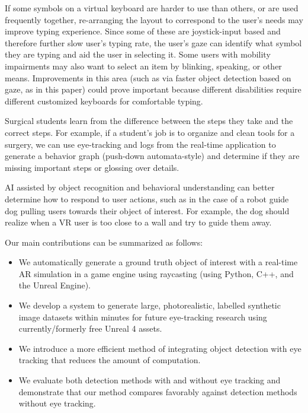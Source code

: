 \begin{description}[leftmargin=*]
    \item[Adaptive Impaired-user Keyboards]
    If some symbols on a virtual keyboard are harder to use than others, or
    are used frequently together, re-arranging the layout to correspond to
    the user's needs may improve typing experience. Since some of these are
    joystick-input based and therefore further slow user's typing rate, the
    user's gaze can identify what symbol they are typing and aid the user in
    selecting it. Some users with mobility impairments may also want to
    select an item by blinking, speaking, or other means. Improvements in
    this area (such as via faster object detection based on gaze, as in this
    paper) could prove important because different disabilities require
    different customized keyboards for comfortable typing.
    \item[Surgical Training]
    Surgical students learn from the difference between the steps they take
    and the correct steps. For example, if a student's job is to organize
    and clean tools for a surgery, we can use eye-tracking and logs from the
    real-time application to generate a behavior graph (push-down
    automata-style) and determine if they are missing important steps or
    glossing over details.
    \item[Dynamic Robot AI]
    AI assisted by object recognition and behavioral understanding can
    better determine how to respond to user actions, such as in the case of
    a robot guide dog pulling users towards their object of interest. For
    example, the dog should realize when a VR user is too close to a wall
    and try to guide them away.
\end{description}
\vspace{-0.5em}
Our main contributions can be summarized as follows:
\vspace{-0.5em}
\begin{itemize}  [noitemsep,leftmargin=*]
    \item
        We automatically generate a ground truth object of interest with a
        real-time AR simulation in a game engine using raycasting
        (using Python, C++, and the Unreal Engine).
    \item
        We develop a system to generate large, photorealistic, labelled synthetic image datasets within minutes for future eye-tracking research using currently/formerly free Unreal 4 assets.
    \item
        We introduce a more efficient method of integrating object detection
        with eye tracking that reduces the amount of computation.
    \item
        We evaluate both detection methods with and without eye tracking and
        demonstrate that our method compares favorably against detection methods
        without eye tracking.
\end{itemize}
